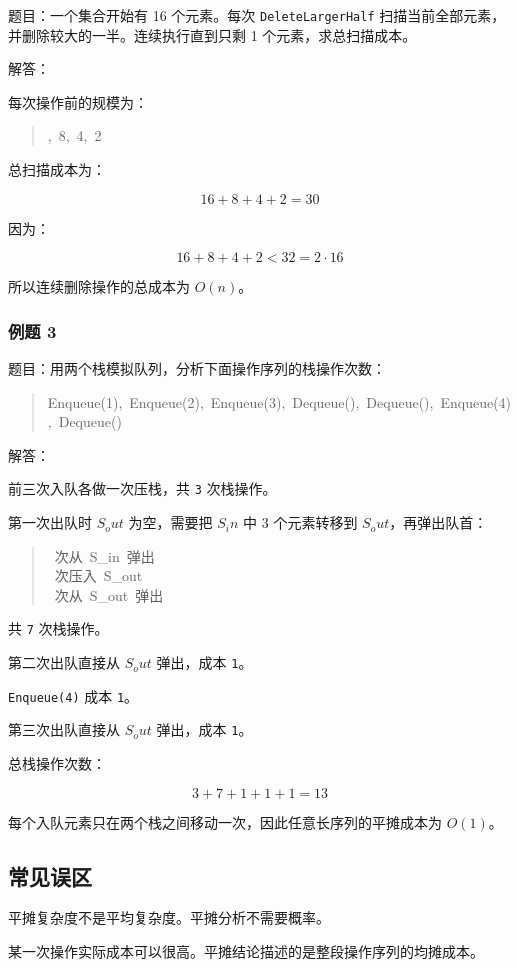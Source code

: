 \documentclass[UTF8,zihao=-4]{ctexart}
\begin{document}
题目：一个集合开始有 16 个元素。每次 \texttt{DeleteLargerHalf} 扫描当前全部元素，并删除较大的一半。连续执行直到只剩 1 个元素，求总扫描成本。

解答：

每次操作前的规模为：

\begin{quote}
\small\ttfamily\raggedright
{},\ 8,\ 4,\ 2\\
\end{quote}

总扫描成本为：

\[16 + 8 + 4 + 2 = 30\]

因为：

\[16 + 8 + 4 + 2 < 32 = 2\cdot 16\]

所以连续删除操作的总成本为 $O(n)$。

\subsubsection*{例题 3}

题目：用两个栈模拟队列，分析下面操作序列的栈操作次数：

\begin{quote}
\small\ttfamily\raggedright
\relax Enqueue(1),\ Enqueue(2),\ Enqueue(3),\ Dequeue(),\ Dequeue(),\ Enqueue(4),\ Dequeue()\\
\end{quote}

解答：

前三次入队各做一次压栈，共 \texttt{3} 次栈操作。

第一次出队时 $S_out$ 为空，需要把 $S_in$ 中 3 个元素转移到 $S_out$，再弹出队首：

\begin{quote}
\small\ttfamily\raggedright
{}\ 次从\ S\_in\ 弹出\\
\ 次压入\ S\_out\\
\ 次从\ S\_out\ 弹出\\
\end{quote}

共 \texttt{7} 次栈操作。

第二次出队直接从 $S_out$ 弹出，成本 \texttt{1}。

\texttt{Enqueue(4)} 成本 \texttt{1}。

第三次出队直接从 $S_out$ 弹出，成本 \texttt{1}。

总栈操作次数：

\[3 + 7 + 1 + 1 + 1 = 13\]

每个入队元素只在两个栈之间移动一次，因此任意长序列的平摊成本为 $O(1)$。

\subsection*{常见误区}

平摊复杂度不是平均复杂度。平摊分析不需要概率。

某一次操作实际成本可以很高。平摊结论描述的是整段操作序列的均摊成本。
\end{document}

